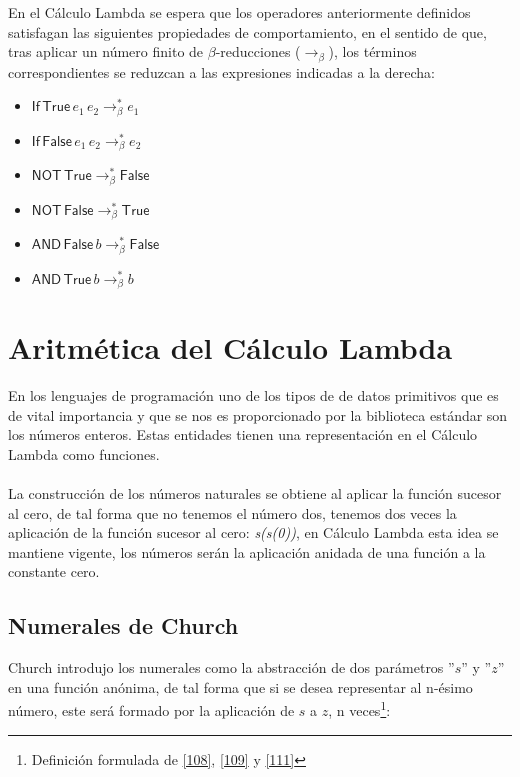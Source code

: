  En el Cálculo Lambda se espera que los operadores anteriormente definidos 
 satisfagan las siguientes propiedades de comportamiento, en el sentido de que, 
 tras aplicar un número finito de $\beta$-reducciones ($\to_\beta$), los términos 
 correspondientes se reduzcan a las expresiones indicadas a la derecha:
 
 \begin{center}
 	
 	\begin{itemize} \centering
 		\item $\mathsf{If}\,\textsf{True}\,e_1\,e_2 \to_\beta^* e_1$ 
 		\item $\mathsf{If}\,\textsf{False}\,e_1\,e_2 \to_\beta^* e_2$ 
 		\item $\mathsf{NOT}\,\textsf{True}\to_\beta^* \textsf{False}$
 		\item $\mathsf{NOT}\,\textsf{False}\to_\beta^* \textsf{True}$
 		\item $\mathsf{AND}\,\textsf{False}\,b\to_\beta^* \textsf{False}$
 		\item $\mathsf{AND}\,\textsf{True}\,b\to_\beta^* b$
 	\end{itemize}
 \end{center} 

     \section{Aritmética del Cálculo Lambda}
        En los lenguajes de programación uno de los tipos de de datos primitivos que es de vital importancia y que se nos es proporcionado por la biblioteca estándar son los números enteros.
        Estas entidades tienen una representación en el Cálculo Lambda como funciones.\\\\
        La construcción de los números naturales se obtiene al aplicar la función sucesor al cero, de tal forma que no tenemos el número dos, tenemos dos veces la aplicación de la función sucesor al cero: \textit{s(s(0))}, en Cálculo Lambda esta idea se mantiene vigente, los números serán la aplicación anidada de una función a la constante cero. 
     \subsection{Numerales de Church}
        Church introdujo los numerales como la abstracción de dos parámetros ''$s$'' y ''$z$'' en una función anónima, de tal forma que si se desea representar al n-ésimo número, este será formado por la aplicación de $s$ a $z$, n veces\footnote{Definición formulada de \hyperlink{108}{[108]},  \hyperlink{109}{[109]} y  \hyperlink{111}{[111]}}:

